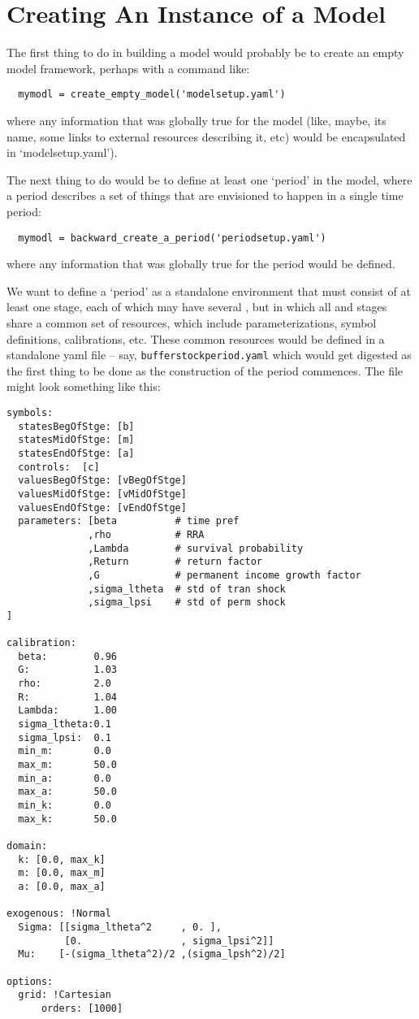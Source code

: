 \documentclass[SolvingMicroDSOPs]{subfiles}
\begin{document}
\section{Creating An Instance of a Model}

The first thing to do in building a model would probably be to create an empty model framework, perhaps with a command like:

\begin{verbatim}
  mymodl = create_empty_model('modelsetup.yaml')
\end{verbatim}
where any information that was globally true for the model (like, maybe, its name, some links to external resources describing it, etc) would be encapsulated in `modelsetup.yaml').

The next thing to do would be to define at least one `period' in the model, where a period describes a set of things that are envisioned to happen in a single time period:
\begin{verbatim}
  mymodl = backward_create_a_period('periodsetup.yaml')
\end{verbatim}
where any information that was globally true for the period would be defined.

We want to define a `period' as a standalone environment that must consist of at least one stage, each of which may have several {\moves}, but in which all {\moves} and stages share a common set of resources, which include parameterizations, symbol definitions, calibrations, etc.  These common resources would be defined in a standalone yaml file -- say, \texttt{bufferstockperiod.yaml} which would get digested as the first thing to be done as the construction of the period commences.  The file might look something like this:

\begin{verbatim}
symbols:
  statesBegOfStge: [b]
  statesMidOfStge: [m]
  statesEndOfStge: [a]
  controls:  [c]
  valuesBegOfStge: [vBegOfStge]
  valuesMidOfStge: [vMidOfStge]
  valuesEndOfStge: [vEndOfStge]
  parameters: [beta          # time pref
              ,rho           # RRA
              ,Lambda        # survival probability
              ,Return        # return factor
              ,G             # permanent income growth factor 
              ,sigma_ltheta  # std of tran shock
              ,sigma_lpsi    # std of perm shock 
]

calibration:
  beta:        0.96
  G:           1.03
  rho:         2.0
  R:           1.04
  Lambda:      1.00
  sigma_ltheta:0.1
  sigma_lpsi:  0.1
  min_m:       0.0
  max_m:       50.0
  min_a:       0.0
  max_a:       50.0
  min_k:       0.0
  max_k:       50.0

domain:
  k: [0.0, max_k]
  m: [0.0, max_m]
  a: [0.0, max_a]

exogenous: !Normal
  Sigma: [[sigma_ltheta^2     , 0. ],
          [0.                 , sigma_lpsi^2]]
  Mu:    [-(sigma_ltheta^2)/2 ,(sigma_lpsh^2)/2]

options:
  grid: !Cartesian
      orders: [1000]
\end{verbatim}
\end{document}
